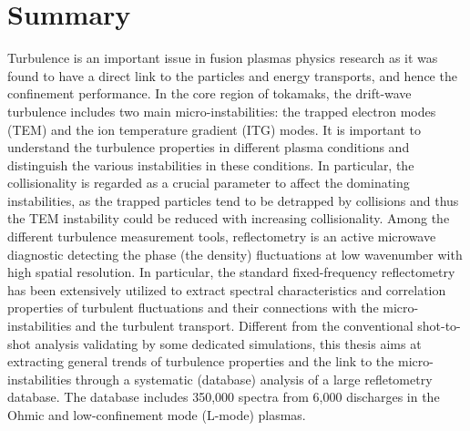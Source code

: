 
\chapter*{Summary}


Turbulence is an important issue in fusion plasmas physics research as it was found to have a direct link to the particles and energy transports, and hence the confinement performance. In the core region of tokamaks, the drift-wave turbulence includes two main micro-instabilities: the trapped electron modes (TEM) and the ion temperature gradient (ITG) modes. It is important to understand the turbulence properties in different plasma conditions and distinguish the various instabilities in these conditions. In particular, the collisionality is regarded as a crucial parameter to affect the dominating instabilities, as the trapped particles tend to be detrapped by collisions and thus the TEM instability could be reduced with increasing collisionality. Among the different turbulence measurement tools, reflectometry is an active microwave diagnostic detecting the phase (the density) fluctuations at low wavenumber with high spatial resolution. In particular, the standard fixed-frequency reflectometry has been extensively utilized to extract spectral characteristics and correlation properties of turbulent fluctuations and their connections with the micro-instabilities and the turbulent transport. Different from the conventional shot-to-shot analysis validating by some dedicated simulations, this thesis aims at extracting general trends of turbulence properties and the link to the micro-instabilities through a systematic (database) analysis of a large refletometry database. The database includes 350,000 spectra from 6,000 discharges in the Ohmic and low-confinement mode (L-mode) plasmas.


